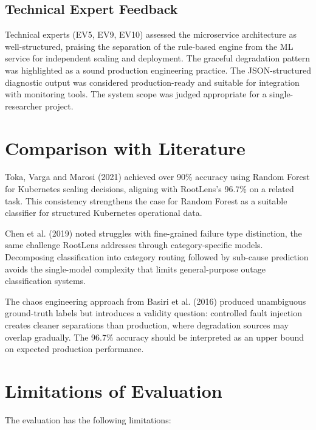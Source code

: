 \subsection{Technical Expert Feedback}
Technical experts (EV5, EV9, EV10) assessed the microservice architecture as well-structured, praising the separation of the rule-based engine from the ML service for independent scaling and deployment. The graceful degradation pattern was highlighted as a sound production engineering practice. The JSON-structured diagnostic output was considered production-ready and suitable for integration with monitoring tools. The system scope was judged appropriate for a single-researcher project.

\section{Comparison with Literature}
Toka, Varga and Marosi (2021) achieved over 90\% accuracy using Random Forest for Kubernetes scaling decisions, aligning with RootLens's 96.7\% on a related task. This consistency strengthens the case for Random Forest as a suitable classifier for structured Kubernetes operational data.

Chen et al. (2019) noted struggles with fine-grained failure type distinction, the same challenge RootLens addresses through category-specific models. Decomposing classification into category routing followed by sub-cause prediction avoids the single-model complexity that limits general-purpose outage classification systems.

The chaos engineering approach from Basiri et al. (2016) produced unambiguous ground-truth labels but introduces a validity question: controlled fault injection creates cleaner separations than production, where degradation sources may overlap gradually. The 96.7\% accuracy should be interpreted as an upper bound on expected production performance.

\section{Limitations of Evaluation}
The evaluation has the following limitations:


